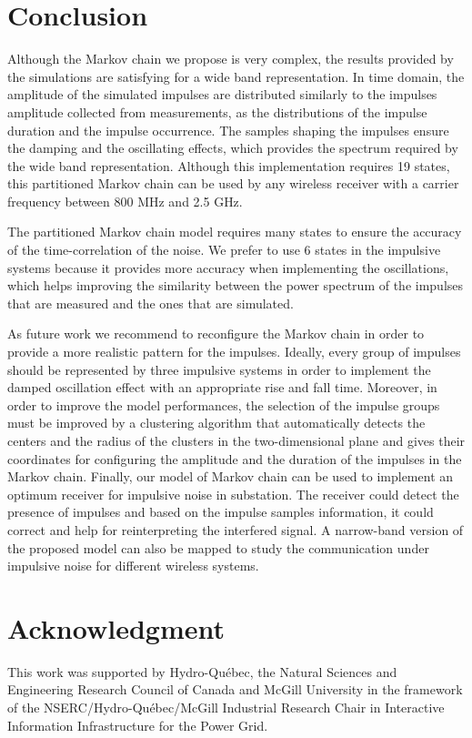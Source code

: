 \documentclass[journal]{IEEEtran}
\begin{document}
\section{Conclusion}
Although the Markov chain we propose is very complex, the results provided by the simulations are satisfying for a wide band representation. In time domain, the amplitude of the simulated impulses are distributed similarly to the impulses amplitude collected from measurements, as the distributions of the impulse duration and the impulse occurrence. The samples shaping the impulses ensure the damping and the oscillating effects, which provides the spectrum required by the wide band representation. Although this implementation requires 19 states, this partitioned Markov chain can be used by any wireless receiver with a carrier frequency between 800 MHz and 2.5 GHz.\

The partitioned Markov chain model requires many states to ensure the accuracy of the time-correlation of the noise. We prefer to use 6 states in the impulsive systems because it provides more accuracy when implementing the oscillations, which helps improving the similarity between the power spectrum of the impulses that are measured and the ones that are simulated.\

As future work we recommend to reconfigure the Markov chain in order to provide a more realistic pattern for the impulses. Ideally, every group of impulses should be represented by three impulsive systems in order to implement the damped oscillation effect with an appropriate rise and fall time. Moreover, in order to improve the model performances, the selection of the impulse groups must be improved by a clustering algorithm that automatically detects the centers and the radius of the clusters in the two-dimensional plane and gives their coordinates for configuring the amplitude and the duration of the impulses in the Markov chain. Finally, our model of Markov chain can be used to implement an optimum receiver for impulsive noise in substation. The receiver could detect the presence of impulses and based on the impulse samples information, it could correct and help for reinterpreting the interfered signal. A narrow-band version of the proposed model can also be mapped to study the communication under impulsive noise for different wireless systems.
\section*{Acknowledgment}
This work was supported by Hydro-Qu\'{e}bec, the Natural Sciences and
Engineering Research Council of Canada and McGill University in the
framework of the NSERC/Hydro-Qu\'{e}bec/McGill Industrial Research Chair
in Interactive Information Infrastructure for the Power Grid.
\end{document}
